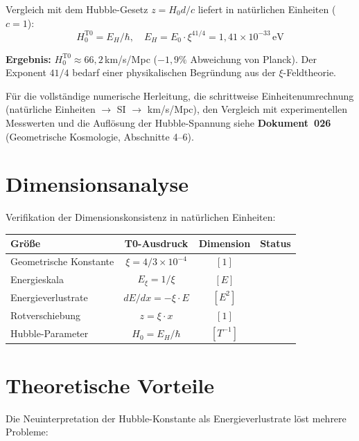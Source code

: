 	Vergleich mit dem Hubble-Gesetz $z = H_0 d/c$ liefert in natürlichen Einheiten ($c = 1$):
	\begin{equation}
		\boxed{H_0^{\text{T0}} = E_H/\hbar, \quad E_H = E_0 \cdot \xi^{41/4} = 1{,}41 \times 10^{-33}\,\text{eV}}
	\end{equation}

	\textbf{Ergebnis:} $H_0^{\text{T0}} \approx 66{,}2\,$km/s/Mpc ($-1{,}9\%$ Abweichung von Planck). Der Exponent $41/4$ bedarf einer physikalischen Begründung aus der $\xi$-Feldtheorie.

	Für die vollständige numerische Herleitung, die schrittweise Einheitenumrechnung (natürliche Einheiten $\rightarrow$ SI $\rightarrow$ km/s/Mpc), den Vergleich mit experimentellen Messwerten und die Auflösung der Hubble-Spannung siehe \textbf{Dokument~026} (Geometrische Kosmologie, Abschnitte 4--6).

\section{Dimensionsanalyse}

	Verifikation der Dimensionskonsistenz in natürlichen Einheiten:

	\begin{center}
		\begin{tabular}{lccc}
			\toprule
			\textbf{Größe} & \textbf{T0-Ausdruck} & \textbf{Dimension} & \textbf{Status} \\
			\midrule
			Geometrische Konstante & $\xi = 4/3 \times 10^{-4}$ & $[1]$ & \checkmark \\
			Energieskala & $E_\xi = 1/\xi$ & $[E]$ & \checkmark \\
			Energieverlustrate & $dE/dx = -\xi \cdot E$ & $[E^2]$ & \checkmark \\
			Rotverschiebung & $z = \xi \cdot x$ & $[1]$ & \checkmark \\
			Hubble-Parameter & $H_0 = E_H/\hbar$ & $[T^{-1}]$ & \checkmark \\
			\bottomrule
		\end{tabular}
	\end{center}

\section{Theoretische Vorteile}

	Die Neuinterpretation der Hubble-Konstante als Energieverlustrate löst mehrere Probleme:

